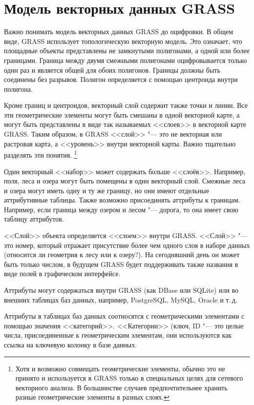 \section{Модель векторных данных GRASS}\label{label_vectmodel}

Важно понимать модель векторных данных GRASS до оцифровки.
В общем виде, GRASS использует топологическую векторную модель.
Это означает, что площадные объекты представлены не замкнутыми
полигонами, а одной или более границами. Граница между двумя смежными
полигонами оцифровывается только один раз и является общей для обоих
полигонов. Границы должны быть соединены без разрывов. Полигон
определяется с помощью центроида внутри полигона.

Кроме границ и центроидов, векторный слой содержит также точки и линии.
Все эти геометрические элементы могут быть смешаны в одной векторной
карте, а могут быть представлены в виде так называемых <<слоев>> в
векторной карте GRASS. Таким образом, в GRASS <<слой>> "--- это не
векторная или растровая карта, а <<уровень>> внутри векторной карты.
Важно тщательно разделять эти понятия.
\footnote{Хотя и возможно совмещать геометрические элементы, обычно это
не принято и используется в GRASS только в специальных целях для сетевого
векторного анализа. В большинстве случаев предпочтительнее хранить разные
геометрические элементы в разных слоях.}

Один векторный <<набор>> может содержать больше <<слоёв>>. Например,
поля, леса и озера могут быть помещены в один векторный слой. Смежные
леса и озера могут иметь одну и ту же границу, но они имеют отдельные
аттрибутивные таблицы. Также возможно присоединять аттрибуты к границам.
Например, если граница между озером и лесом "--- дорога, то она имеет
свою таблицу аттрибутов.

<<Слой>> объекта определяется <<слоем>> внутри GRASS. <<Слой>> "--- это
номер, который отражает присутствие более чем одного слоя в наборе
данных (относится ли геометрия к лесу или к озеру?). На сегодняшний день
он может быть только числом, в будущем GRASS будет поддерживать также
названия в виде полей в графическом интерфейсе.

Аттрибуты могут содержаться внутри  GRASS (как DBase
или SQLite) или во внешних таблицах баз данных, например, PostgreSQL,
MySQL, Oracle и т.\,д.

Аттрибуты в таблицах баз данных соотносятся с геометрическими
элементами с помощью значения <<категорий>>.
<<Категории>> (ключ, ID "--- это целые числа, присоединенные к
геометрическим элементам, они используются как ссылка на ключевую
колонку в базе данных.

